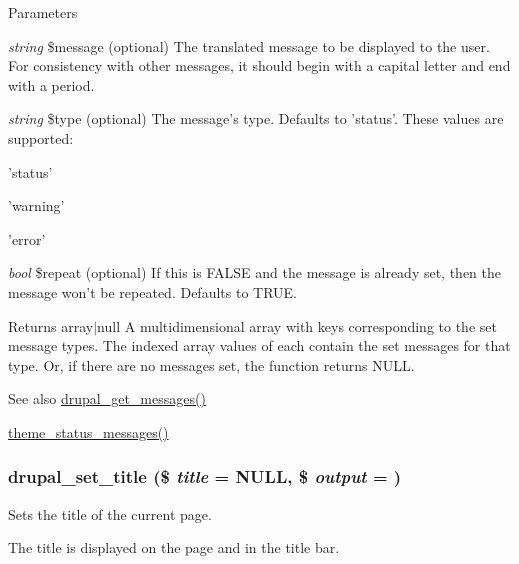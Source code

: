 \begin{DoxyParams}{Parameters}
\item[{\em string}]\$message (optional) The translated message to be displayed to the user. For consistency with other messages, it should begin with a capital letter and end with a period. \item[{\em string}]\$type (optional) The message's type. Defaults to 'status'. These values are supported:
\begin{DoxyItemize}
\item 'status'
\item 'warning'
\item 'error' 
\end{DoxyItemize}\item[{\em bool}]\$repeat (optional) If this is FALSE and the message is already set, then the message won't be repeated. Defaults to TRUE.\end{DoxyParams}
\begin{DoxyReturn}{Returns}
array$|$null A multidimensional array with keys corresponding to the set message types. The indexed array values of each contain the set messages for that type. Or, if there are no messages set, the function returns NULL.
\end{DoxyReturn}
\begin{DoxySeeAlso}{See also}
\hyperlink{bootstrap_8inc_a2c9915d030bad8c5bacf6de25e6fd14c}{drupal\_\-get\_\-messages()} 

\hyperlink{group__themeable_gad29a18ad4d19a5fc0a3c75a8804f0331}{theme\_\-status\_\-messages()} 
\end{DoxySeeAlso}
\hypertarget{bootstrap_8inc_a1994d49eb621df71fe1306e13b7e4910}{
\subsubsection[{drupal\_\-set\_\-title}]{\setlength{\rightskip}{0pt plus 5cm}drupal\_\-set\_\-title (\$ {\em title} = {\ttfamily NULL}, \/  \$ {\em output} = {})}}
\label{bootstrap_8inc_a1994d49eb621df71fe1306e13b7e4910}
Sets the title of the current page.

The title is displayed on the page and in the title bar.


